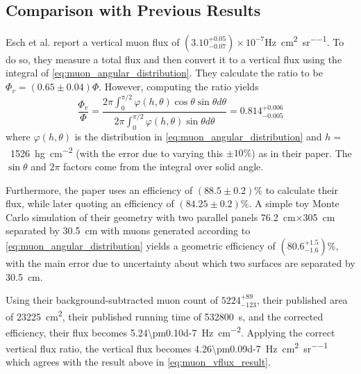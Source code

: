 \documentclass[herrin-thesis.tex]{subfiles}
\begin{document}
\subsection{Comparison with Previous Results}
Esch et al.\cite{Esch:2004zj} report a vertical muon flux of \((3.10^{+0.05}_{-0.07})\times10^{-7}\)\si{\Hz\per\square\cm\per\steradian}. To do so, they measure a total flux and then convert it to a vertical flux using the integral of \cref{eq:muon_angular_distribution}. They calculate the ratio to be \(\Phi_v = (0.65\pm0.04)\Phi\). However, computing the ratio yields 
\begin{equation}
\label{eq:muon_esch_integral}
\frac{\Phi_v}{\Phi} = \frac{2 \pi \int_0^{\pi/2} \varphi(h,\theta)\cos\theta\sin\theta d\theta}{2 \pi \int_0^{\pi/2} \varphi(h,\theta)\sin\theta d\theta} = 0.814^{+0.006}_{-0.005}
\end{equation}
where \(\varphi(h,\theta)\) is the distribution in \cref{eq:muon_angular_distribution} and \(h = \)~\SI{1526}{\hecto\gram\per\square\cm} (with the error due to varying this \(\pm10\%\)) as in their paper. The \(\sin\theta\) and \(2 \pi\) factors come from the integral over solid angle.

Furthermore, the paper uses an efficiency of \((88.5\pm0.2)\%\) to calculate their flux, while later quoting an efficiency of \((84.25\pm0.2)\%\). A simple toy Monte Carlo simulation of their geometry with two parallel panels \SI{76.2}{\cm}\(\times\)\SI{305}{\cm} separated by \SI{30.5}{\cm} with muons generated according to \cref{eq:muon_angular_distribution} yields a geometric efficiency of \((80.6^{+1.5}_{-1.6})\%\), with the main error due to uncertainty about which two surfaces are separated by \SI{30.5}{\cm}.

Using their background-subtracted muon count of \(5224^{+89}_{-123}\), their published area of \SI{23225}{\square\cm}, their published running time of \SI{532800}{s}, and the corrected efficiency, their flux becomes \SI{5.24\pm0.10d-7}{\Hz\per\square\cm}. Applying the correct vertical flux ratio, the vertical flux becomes \SI{4.26\pm0.09d-7}{\Hz\per\square\cm\per\steradian} which agrees with the result above in \cref{eq:muon_vflux_result}.

%
%
\end{document}
